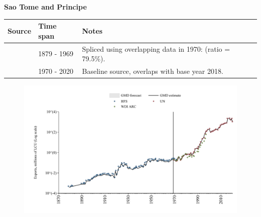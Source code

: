\documentclass[12pt,a4paper,landscape]{article}
\begin{document}
\begin{adjustbox}{max totalsize={\paperwidth}{\paperheight},center}
\begin{minipage}[t][\textheight][t]{\textwidth}
\vspace*{0.5cm}
{}
\begin{center}
{\Large\bfseries Sao Tome and Principe}
\end{center}
\vspace{0.5cm}
\begin{table}[H]
\centering
\small
\begin{tabular}{|l|l|l|}
\hline
\textbf{Source} & \textbf{Time span} & \textbf{Notes} \\
\hline
\rowcolor{white}\cite{HFS}& 1879 - 1969 &Spliced using overlapping data in 1970: (ratio = 79.5\%).\\
\rowcolor{lightgray}\cite{UN}& 1970 - 2020 &Baseline source, overlaps with base year 2018.\\
\hline
\end{tabular}
\end{table}
\begin{figure}[H]
\centering
\includegraphics[width=\textwidth,height=0.6\textheight,keepaspectratio]{graphs/STP_exports.pdf}
\end{figure}
\end{minipage}
\end{adjustbox}
\end{document}
